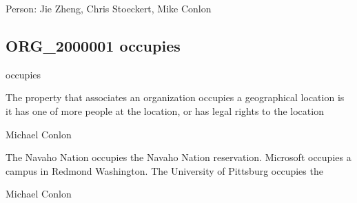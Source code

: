 \documentclass[letterpaper,10pt,english]{sphinxmanual}
\begin{document}
\begin{sphinxShadowBox}

\sphinxAtStartPar
Person: Jie Zheng, Chris Stoeckert, Mike Conlon
\end{sphinxShadowBox}
\begin{quote}

\ignorespaces \end{quote}


\subsection{ORG\_2000001 \sphinxhyphen{} occupies}
\label{\detokenize{doc-ORG_2000001:org-2000001-occupies}}\label{\detokenize{doc-ORG_2000001:index-0}}\label{\detokenize{doc-ORG_2000001::doc}}
\begin{sphinxShadowBox}

\sphinxAtStartPar
occupies
\end{sphinxShadowBox}

\begin{sphinxShadowBox}

\sphinxAtStartPar
The property that associates an organization occupies a geographical location is it has one of more people at the location, or has legal rights to the location
\end{sphinxShadowBox}

\begin{sphinxShadowBox}

\sphinxAtStartPar
Michael Conlon 
\end{sphinxShadowBox}

\begin{sphinxShadowBox}

\sphinxAtStartPar
The Navaho Nation occupies the Navaho Nation reservation.  Microsoft occupies a campus in Redmond Washington.  The University of Pittsburg occupies the
\end{sphinxShadowBox}

\begin{sphinxShadowBox}

\sphinxAtStartPar
Michael Conlon 
\end{sphinxShadowBox}
\begin{quote}

\ignorespaces \end{quote}
\end{document}
